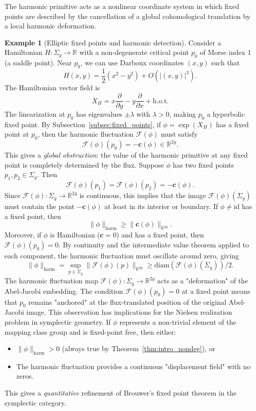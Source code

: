 \documentclass[11pt]{article}
\theoremstyle{definition}
\newtheorem{example}[theorem]{Example}
\begin{document}
	The harmonic primitive acts as a nonlinear coordinate system in which fixed
	points are described by the cancellation of a global cohomological translation
	by a local harmonic deformation.
	
	\begin{example}[Elliptic fixed points and harmonic detection]
		\label{ex:elliptic_fixed_point}
		Consider a Hamiltonian $H: \Sigma_g \to \mathbb{R}$ with a non-degenerate 
		critical point $p_0$ of Morse index $1$ (a saddle point).	Near $p_0$, we can use Darboux coordinates $(x,y)$ such that
		\[
		H(x,y) = \frac{1}{2}(x^2 - y^2) + O(|(x,y)|^3).
		\]
		The Hamiltonian vector field is
		\[
		X_H = x \frac{\partial}{\partial y} - y \frac{\partial}{\partial x} + \text{h.o.t.}
		\]
		The linearization at $p_0$ has eigenvalues $\pm \lambda$ with $\lambda > 0$, 
		making $p_0$ a hyperbolic fixed point. 
		By Subsection~\ref{subsec:fixed_points}, if $\phi = \exp(X_H)$ has a fixed 
		point at $p_0$, then the harmonic fluctuation $\mathcal{F}(\phi)$ must 
		satisfy
		\[
		\mathcal{F}(\phi)(p_0) = -\mathbf c(\phi) \in \mathbb{R}^{2g}.
		\]
		This gives a \emph{global obstruction}: the value of the harmonic primitive 
		at any fixed point is completely determined by the flux. 
		Suppose $\phi$ has two fixed points $p_1, p_2 \in \Sigma_g$. Then
		\[
		\mathcal{F}(\phi)(p_1) = \mathcal{F}(\phi)(p_2) = -\mathbf c(\phi).
		\]
		Since $\mathcal{F}(\phi): \Sigma_g \to \mathbb{R}^{2g}$ is continuous, 
		this implies that the image $\mathcal{F}(\phi)(\Sigma_g)$ must contain 
		the point $-\mathbf c(\phi)$ at least in its interior or boundary. 
		If $\phi \neq \text{id}$ has a fixed point, then
		\[
		\|\phi\|_{\mathrm{harm}} 
		\geq 
		\|\mathbf c(\phi)\|_{\mathbb{R}^{2g}}.
		\]
		Moreover, if $\phi$ is Hamiltonian ($\mathbf c = 0$) and has a fixed point, 
		then $\mathcal{F}(\phi)(p_0) = 0$. By continuity and the intermediate 
		value theorem applied to each component, the harmonic fluctuation must 
		oscillate around zero, giving
		\[
		\|\phi\|_{\mathrm{harm}} 
		= 
		\sup_{p \in \Sigma_g} \|\mathcal{F}(\phi)(p)\|_{\mathbb{R}^{2g}} 
		\geq 
		\text{diam}(\mathcal{F}(\phi)(\Sigma_g))/2.
		\] 
		The harmonic fluctuation map $\mathcal{F}(\phi): \Sigma_g \to \mathbb{R}^{2g}$ 
		acts as a "deformation" of the Abel-Jacobi embedding. The condition 
		$\mathcal{F}(\phi)(p_0) = 0$ at a fixed point means that $p_0$ remains 
		"anchored" at the flux-translated position of the original Abel-Jacobi image. 
		This observation has implications for the Nielsen realization problem in 
		symplectic geometry. If $\phi$ represents a non-trivial element of the 
		mapping class group and is fixed-point free, then either:
		\begin{itemize}
			\item $\|\phi\|_{\mathrm{harm}} > 0$ (always true by 
			Theorem~\ref{thm:intro_nondeg}), or
			\item The harmonic fluctuation provides a continuous "displacement 
			field" with no zeros.
		\end{itemize}
		
		This gives a \emph{quantitative} refinement of Brouwer's fixed point theorem 
		in the symplectic category.
	\end{example}
	
\end{document}
